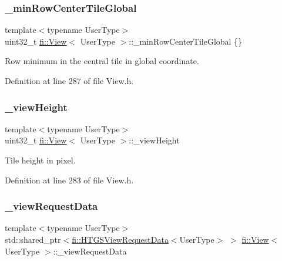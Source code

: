 \subsubsection{\texorpdfstring{\+\_\+min\+Row\+Center\+Tile\+Global}{\_minRowCenterTileGlobal}}
{\footnotesize\ttfamily template$<$typename User\+Type$>$ \\
uint32\+\_\+t \hyperlink{classfi_1_1View}{fi\+::\+View}$<$ User\+Type $>$\+::\+\_\+min\+Row\+Center\+Tile\+Global \{\}\hspace{0.3cm}{\ttfamily [private]}}



Row minimum in the central tile in global coordinate. 



Definition at line 287 of file View.\+h.

\mbox{\label{classfi_1_1View_aafa2b86f9582cb59b60418b904abb5b2}} 
\subsubsection{\texorpdfstring{\+\_\+view\+Height}{\_viewHeight}}
{\footnotesize\ttfamily template$<$typename User\+Type$>$ \\
uint32\+\_\+t \hyperlink{classfi_1_1View}{fi\+::\+View}$<$ User\+Type $>$\+::\+\_\+view\+Height\hspace{0.3cm}{\ttfamily [private]}}



Tile height in pixel. 



Definition at line 283 of file View.\+h.

\mbox{\label{classfi_1_1View_aea86565df8c8407afd3192d5a21a7821}} 
\subsubsection{\texorpdfstring{\+\_\+view\+Request\+Data}{\_viewRequestData}}
{\footnotesize\ttfamily template$<$typename User\+Type$>$ \\
std\+::shared\+\_\+ptr$<$\hyperlink{classfi_1_1HTGSViewRequestData}{fi\+::\+H\+T\+G\+S\+View\+Request\+Data}$<$User\+Type$>$ $>$ \hyperlink{classfi_1_1View}{fi\+::\+View}$<$ User\+Type $>$\+::\+\_\+view\+Request\+Data\hspace{0.3cm}{\ttfamily [private]}}



